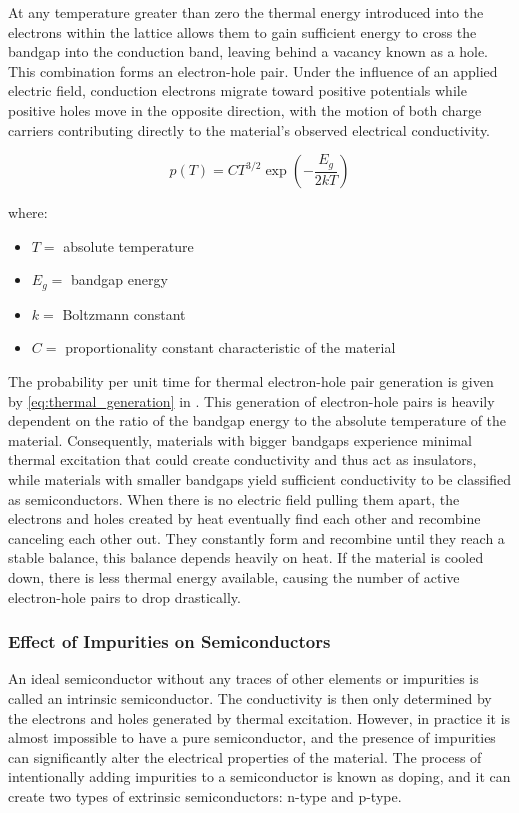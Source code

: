 At any temperature greater than zero the thermal energy introduced into the electrons within the lattice allows them to gain sufficient energy to cross the bandgap into the conduction band, leaving behind a vacancy known as a hole. This combination forms an electron-hole pair. Under the influence of an applied electric field, conduction electrons migrate toward positive potentials while positive holes move in the opposite direction, with the motion of both charge carriers contributing directly to the material's observed electrical conductivity. 

\begin{equation}
    p(T) = C T^{3/2} \exp\left(-\frac{E_g}{2kT}\right)
    \label{eq:thermal_generation}
\end{equation}

where:
\begin{itemize}
    \item $T =$ absolute temperature
    \item $E_g =$ bandgap energy
    \item $k =$ Boltzmann constant
    \item $C =$ proportionality constant characteristic of the material
\end{itemize}

The probability per unit time for thermal electron-hole pair generation is given by \cref{eq:thermal_generation} in \cite[p. 367]{knollRadiationDetectionMeasurement2010}. This generation of electron-hole pairs is heavily dependent on the ratio of the bandgap energy to the absolute temperature of the material. Consequently, materials with bigger bandgaps experience minimal thermal excitation that could create conductivity and thus act as insulators, while materials with smaller bandgaps yield sufficient conductivity to be classified as semiconductors. When there is no electric field pulling them apart, the electrons and holes created by heat eventually find each other and recombine canceling each other out. They constantly form and recombine until they reach a stable balance, this balance depends heavily on heat. If the material is cooled down, there is less thermal energy available, causing the number of active electron-hole pairs to drop drastically.


\subsubsection{Effect of Impurities on Semiconductors}

An ideal semiconductor without any traces of other elements or impurities is called an intrinsic semiconductor. The conductivity is then only determined by the electrons and holes generated by thermal excitation. However, in practice it is almost impossible to have a pure semiconductor, and the presence of impurities can significantly alter the electrical properties of the material. The process of intentionally adding impurities to a semiconductor is known as doping, and it can create two types of extrinsic semiconductors: n-type and p-type.

